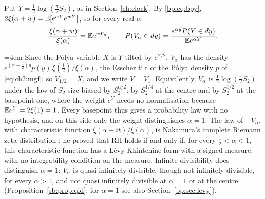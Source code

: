 Put $Y=\frac12\log(\frac\pi2S_2)$, as in Section~\ref{ch:clock}. By \eqref{bp:eq:bpy}, $2\xi(\alpha+w)=\mathbb{E}[e^{\alpha Y}e^{wY}]$, so for every real $\alpha$
\[
\frac{\xi(\alpha+w)}{\xi(\alpha)}=\mathbb{E} e^{wV_\alpha},\qquad P(V_\alpha\in dy)=\frac{e^{\alpha y}P(Y\in dy)}{\mathbb{E} e^{\alpha Y}} .
\]
{\emergencystretch=4em Since the P\'olya variable $X$ is $Y$ tilted by $e^{Y/2}$, $V_\alpha$ has the density $e^{(\alpha-\frac12)y}p(y)\,\xi(\frac12)/\xi(\alpha)$, the Esscher tilt of the P\'olya density $p$ of \eqref{eq:ch2:mgf}; so $V_{1/2}=X$, and we write $V=V_1$. Equivalently, $V_\alpha$ is $\frac12\log(\frac\pi2S_2)$ under the law of $S_2$ size biased by $S_2^{\alpha/2}$: by $S_2^{1/4}$ at the centre and by $S_2^{1/2}$ at the basepoint one, where the weight $e^Y$ needs no normalisation because $\mathbb{E} e^Y=2\xi(1)=1$. Every basepoint thus gives a probability law with no hypothesis, and on this side only the weight distinguishes $\alpha=1$. The law of $-V_\alpha$, with characteristic function $\xi(\alpha-it)/\xi(\alpha)$, is Nakamura's complete Riemann zeta distribution \cite{Nakamura15}; he proved that RH holds if and only if, for every $\frac12<\alpha<1$, this characteristic function has a L\'evy Khintchine form with a signed measure, with no integrability condition on the measure. Infinite divisibility does distinguish $\alpha=1$: $V_\alpha$ is quasi infinitely divisible, though not infinitely divisible, for every $\alpha>1$, and not quasi infinitely divisible at $\alpha=1$ or at the centre (Proposition~\ref{sb:prop:qid}; for $\alpha=1$ see also Section~\ref{bp:sec:levy}).\par}

